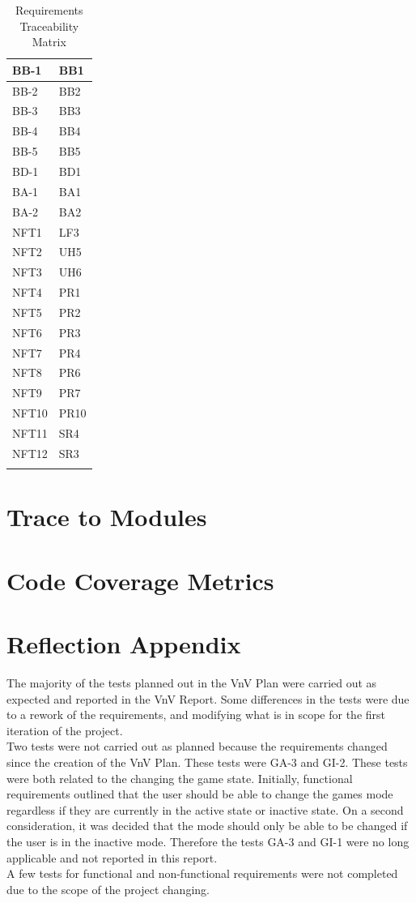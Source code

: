 \documentclass[12pt, titlepage]{article}
\begin{document}
\begin{longtable}{| p{} | p{} |}
  \hline
  BB-1 & BB1\\
  \hline
  BB-2 & BB2\\
  \hline
  BB-3 & BB3\\
  \hline
  BB-4 & BB4\\
  \hline
  BB-5 & BB5\\
  \hline
  BD-1 & BD1\\
  \hline
  BA-1 & BA1\\
  \hline
  BA-2 & BA2\\
  \hline
  NFT1 & LF3\\
  \hline
  NFT2 & UH5\\
  \hline
  NFT3 & UH6\\
  \hline
  NFT4 & PR1\\
  \hline
  NFT5 & PR2\\
  \hline
  NFT6 & PR3\\
  \hline
  NFT7 & PR4\\
  \hline
  NFT8 & PR6\\
  \hline
  NFT9 & PR7\\
  \hline
  NFT10 & PR10\\
  \hline
  NFT11 & SR4\\
  \hline
  NFT12 & SR3\\
  \hline
\caption{Requirements Traceability Matrix}
\end{longtable}
		
\section{Trace to Modules}		

\section{Code Coverage Metrics}

\appendix
\section{Reflection Appendix}
The majority of the tests planned out in the VnV Plan were carried out as expected and reported in the VnV Report. 
Some differences in the tests were due to a rework of the requirements, and modifying what is in scope for the first iteration of the project.\\

Two tests were not carried out as planned because the requirements changed since the creation of the VnV Plan. These tests were GA-3 and GI-2.
These tests were both related to the changing the game state. Initially, functional requirements outlined that the user should be able to change the games mode
regardless if they are currently in the active state or inactive state. On a second consideration, it was decided that the mode should only be able to be changed if
the user is in the inactive mode. Therefore the tests GA-3 and GI-1 were no long applicable and not reported in this report. \\

A few tests for functional and non-functional requirements were not completed due to the scope of the project changing.



\nocite{*}
\end{document}
